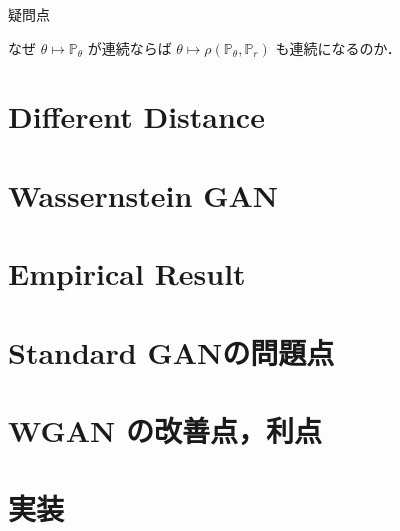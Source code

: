 \documentclass[uplatex, dvipdfmx]{jsarticle}
\theoremstyle{definition}
\begin{document}
\begin{itembox}[l]{疑問点}
\begin{enumerate}
            なぜ $\theta \longmapsto \mathbb{P}_{\theta}$ が連続ならば $\theta \longmapsto \rho (\mathbb{P}_{\theta}, \mathbb{P}_{r})$ も連続になるのか．

        \end{enumerate}
        
    \end{itembox}

    \section{Different Distance}

    \section{Wassernstein GAN}

    \section{Empirical Result}
    \section{Standard GANの問題点}

    \section{WGAN の改善点，利点}

    \section{実装}
\end{document}
